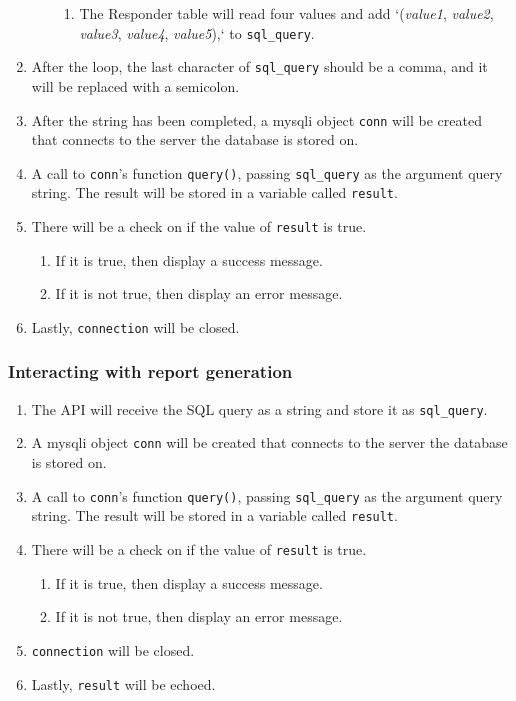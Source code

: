 \begin{enumerate}
\begin{enumerate}
\begin{enumerate}
			\item The Responder table will read four values and add `(\emph{value1}, \emph{value2}, \emph{value3}, \emph{value4}, \emph{value5}),` to \texttt{sql\_query}.
		\end{enumerate}
	\end{enumerate}
	\item After the loop, the last character of \texttt{sql\_query} should be a comma, and it will be replaced with a semicolon.
	\item After the string has been completed, a mysqli object \texttt{conn} will be created that connects to the server the database is stored on.
	\item A call to \texttt{conn}'s function \texttt{query()}, passing \texttt{sql\_query} as the argument query string.
				The result will be stored in a variable called \texttt{result}.
	\item There will be a check on if the value of \texttt{result} is true.
	\begin{enumerate}
		\item If it is true, then display a success message.
		\item If it is not true, then display an error message.
	\end{enumerate}
	\item Lastly, \texttt{connection} will be closed.
\end{enumerate}

\subsubsection{Interacting with report generation}
\begin{enumerate}
	\item The API will receive the SQL query as a string and store it as \texttt{sql\_query}.
	\item A mysqli object \texttt{conn} will be created that connects to the server the database is stored on.
	\item A call to \texttt{conn}'s function \texttt{query()}, passing \texttt{sql\_query} as the argument query string.
				The result will be stored in a variable called \texttt{result}.
	\item There will be a check on if the value of \texttt{result} is true.
	\begin{enumerate}
		\item If it is true, then display a success message.
		\item If it is not true, then display an error message.
	\end{enumerate}
	\item \texttt{connection} will be closed.
	\item Lastly, \texttt{result} will be echoed.
\end{enumerate}



